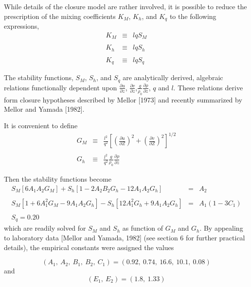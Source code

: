 \documentclass[oribibl]{llncs}
\begin{document}
While details of the closure model are rather involved, it is possible to reduce the prescription of the mixing coefficients $K_M$, $K_h$, and $K_q$ to the following expressions,
\begin{eqnarray}
K_M &\equiv& l q S_M \\ \nonumber \\
K_h &\equiv& l q S_h \\ \nonumber \\
K_q  &\equiv& l q S_q
\end{eqnarray}

The stability functions, $S_M$, $S_h$, and $S_q$ are analytically derived, algebraic relations functionally dependent upon $\frac{\partial u}{\partial z}$, $\frac{\partial v}{\partial z}$,$\frac{g}{\rho_0} \frac{\partial \rho}{\partial z}$, $q$ and $l$. These relations derive form closure hypotheses described by Mellor [1973] and recently summarized by Mellor and Yamada [1982].

It is convenient to define
\begin{eqnarray}
G_M &\equiv& \frac{l^2}{q^2} \left[ \left( \frac{\partial u}{\partial Z}\right)^2 + \left( \frac{\partial v}{\partial Z}\right)^2 \right]^{1/2} \\ \nonumber \\
G_h &\equiv& \frac{l^2}{q^2} \frac{g}{\rho_0}\frac{\partial \rho}{\partial z}
\end{eqnarray}

Then the stability functions become
\begin{eqnarray}
S_M [6 A_1 A_2 G_M] + S_h [1-2 A_2 B_2 G_h - 12 A_1 A_2 G_h] &=&A_2 \\ \nonumber \\
S_M [1+6 A_1^2 G_M -9 A_1 A_2 G_h] -S_h [12 A_1^2 G_h + 9 A_1 A_2 G_h] &=& A_1 (1-3 C_1)\\ \nonumber \\
S_q=0.20
\end{eqnarray}
which are readily solved for $S_M$ and $S_h$ as function of $G_M$ and $G_h$. By appealing to laboratory data [Mellor and Yamada, 1982] (see section 6 for further practical details), the empirical constants were assigned the values

\begin{equation}
(A_1,\ A_2,\ B_1,\ B_2,\ C_1) = (0.92,\ 0.74,\ 16.6,\ 10.1,\ 0.08)
\end{equation}
and
\begin{equation}
(E_1,\ E_2) = (1.8,\ 1.33)
\end{equation}
\end{document}

